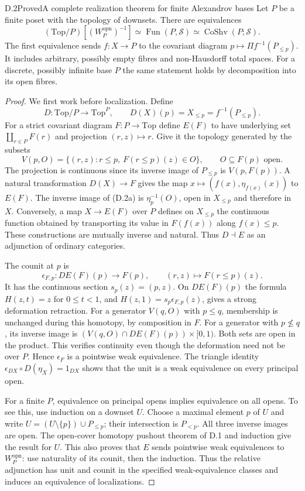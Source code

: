\begin{claim}{D.2}{Proved}{A complete realization theorem for finite Alexandrov bases}
Let $P$ be a finite poset with the topology of downsets. There are
equivalences
\[
 (\mathrm{Top}/P)[(W^{\mathrm{opn}}_P)^{-1}]
   \simeq\operatorname{Fun}(P,\mathcal S)
   \simeq\operatorname{CoShv}(P;\mathcal S).
\tag{D.2}
\]
The first equivalence sends $f:X\to P$ to the covariant diagram
$p\mapsto\Pi f^{-1}(P_{\leq p})$. It includes arbitrary, possibly empty
fibres and non-Hausdorff total spaces. For a discrete, possibly infinite
base $P$ the same statement holds by decomposition into its open fibres.
\end{claim}
\begin{proof}
We first work before localization. Define
\[
 D:\mathrm{Top}/P\longrightarrow\mathrm{Top}^P,
 \qquad D(X)(p)=X_{\leq p}=f^{-1}(P_{\leq p}).
\]
For a strict covariant diagram $F:P\to\mathrm{Top}$ define $E(F)$ to
have underlying set $\coprod_{r\in P}F(r)$ and projection $(r,z)\mapsto r$.
Give it the topology generated by the subsets
\[
 V(p,O)=\{(r,z):r\leq p,\ F(r\leq p)(z)\in O\},
 \qquad O\subseteq F(p)\text{ open}.
\tag{D.2a}
\]
The projection is continuous since its inverse image of $P_{\leq p}$
is $V(p,F(p))$. A natural transformation $D(X)\to F$ gives the map
$x\mapsto(f(x),\eta_{f(x)}(x))$ to $E(F)$. The inverse image of (D.2a)
is $\eta_p^{-1}(O)$, open in $X_{\leq p}$ and therefore in $X$.
Conversely, a map $X\to E(F)$ over $P$ defines on $X_{\leq p}$ the
continuous function obtained by transporting its value in $F(f(x))$
along $f(x)\leq p$. These constructions are mutually inverse and
natural. Thus $D\dashv E$ as an adjunction of ordinary categories.

The counit at $p$ is
\[
 \epsilon_{F,p}:D E(F)(p)\longrightarrow F(p),
 \qquad(r,z)\longmapsto F(r\leq p)(z).
\]
It has the continuous section $s_p(z)=(p,z)$. On $D E(F)(p)$ the
formula $H(z,t)=z$ for $0\leq t<1$, and
$H(z,1)=s_p\epsilon_{F,p}(z)$, gives a strong deformation retraction.
For a generator $V(q,O)$ with $p\leq q$, membership is unchanged during
this homotopy, by composition in $F$. For a generator with $p\nleq q$,
its inverse image is $(V(q,O)\cap D E(F)(p))\times[0,1)$.
Both sets are open in the product. This verifies continuity even though
the deformation need not be over $P$. Hence $\epsilon_F$ is a pointwise
weak equivalence. The triangle identity
$\epsilon_{D X}\circ D(\eta_X)=1_{D X}$ shows that the unit is a weak
equivalence on every principal open.

For a finite $P$, equivalence on principal opens implies equivalence on
all opens. To see this, use induction on a downset $U$. Choose a maximal
element $p$ of $U$ and write
$U=(U\setminus\{p\})\cup P_{\leq p}$; their intersection is
$P_{<p}$. All three inverse images are open. The open-cover homotopy
pushout theorem of D.1 and induction give the result for $U$. This also
proves that $E$ sends pointwise weak equivalences to
$W^{\mathrm{opn}}_P$: use naturality of its counit, then the induction.
Thus the relative adjunction has unit and counit in the specified
weak-equivalence classes and induces an equivalence of localizations.


\end{proof}
